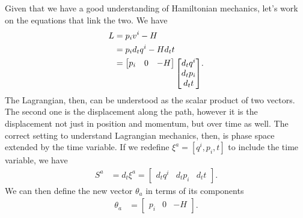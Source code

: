 Given that we have a good understanding of Hamiltonian mechanics, let's work on the equations that link the two. We have
\begin{equation}
	\begin{aligned}
		L &= p_i v^i - H \\
		&= p_i d_t q^i - H d_t t \\
		&= 
		\begin{bmatrix}
			p_i & 0 & -H
		\end{bmatrix} 
	\raisebox{-1.2em}{$
		\begin{bmatrix}
			d_t q^i \\
			d_t p_i \\
			d_t t
		\end{bmatrix}
		$}.
	\end{aligned}
\end{equation}
The Lagrangian, then, can be understood as the scalar product of two vectors. The second one is the displacement along the path, however it is the displacement not just in position and momentum, but over time as well. The correct setting to understand Lagrangian mechanics, then, is phase space extended by the time variable. If we redefine $\xi^a = [q^i, p_i , t]$ to include the time variable, we have
\begin{equation}
	\begin{aligned}
		S^a &= d_t \xi^a = \begin{bmatrix}
			d_t q^i & d_t p_i & d_t t
		\end{bmatrix}.
	\end{aligned}
\end{equation}
We can then define the new vector $\theta_a$ in terms of its components
\begin{equation}
	\begin{aligned}
		\theta_a &= \begin{bmatrix}
			p_i & 0 & - H
		\end{bmatrix}.
	\end{aligned}
\end{equation}

